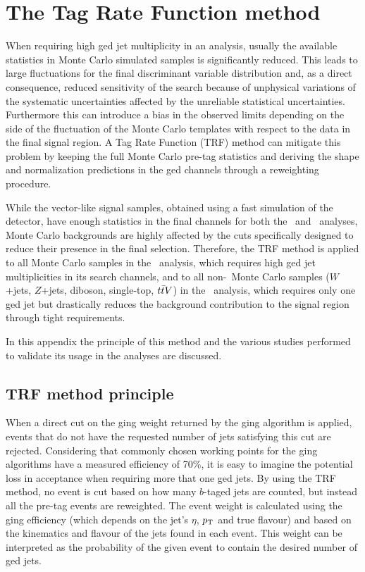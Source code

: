 \clearpage{\pagestyle{empty}\cleardoublepage}

\chapter{The Tag Rate Function method}\label{app:trf}

When requiring high \btag ged jet multiplicity in an analysis, 
usually the available statistics in Monte Carlo simulated  samples 
is significantly reduced. This leads to large fluctuations
for the final discriminant variable distribution
and, as a direct consequence, reduced sensitivity of
the search because of unphysical variations of 
the systematic uncertainties affected by the unreliable
statistical uncertainties.
Furthermore this can introduce a bias in the observed limits
depending on the side of the fluctuation of the Monte Carlo
templates with respect to the data in the final signal region.
A Tag Rate Function (TRF) method can mitigate this problem
by keeping the full Monte Carlo pre-tag statistics and deriving
the shape and normalization predictions in the \btag ged channels
through a reweighting procedure.

While the vector-like signal samples, obtained using a fast simulation
of the detector, have enough statistics in the final channels for
both the \wbx\ and \htx\ analyses, Monte Carlo backgrounds are highly
affected by the cuts specifically designed to reduce their presence
in the final selection.
Therefore, the TRF method is applied to all Monte Carlo samples in
the \htx\ analysis, which requires high \btag ged jet multiplicities
in its search channels, and to all non-\ttbar\ Monte Carlo samples
($W$+jets, $Z$+jets, diboson, single-top, $\ttbar V$) in the \wbx\ 
analysis, which requires only one \btag ged jet but drastically
reduces the background contribution to the signal region through
tight requirements.

In this appendix the principle of this method and the various 
studies performed to validate its usage in the analyses
are discussed.



\section{TRF method principle}

When a direct cut on the
\btag ging weight returned by the \btag ging algorithm
is applied, events that do not have the requested number
of jets satisfying this cut are rejected. Considering that
commonly chosen working points for the \btag ging algorithms
have a measured efficiency of 70\%, it is easy to imagine the
potential loss in acceptance when requiring more that one
\btag ged jets.
By using the TRF method, no event is cut based on how many
$b$-taged jets are counted, but instead all the pre-tag events 
are reweighted.
The event weight is calculated using the \btag ging efficiency
(which depends on the jet's $\eta$, $\pt$ and true flavour)
and based on the kinematics and flavour of the 
jets found in each event.
This weight can be interpreted as the probability of the 
given event to contain the desired number of \btag ged jets. 

